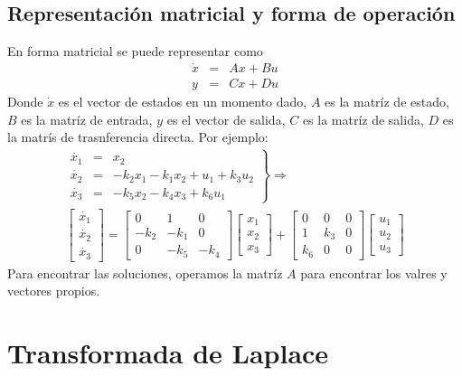 \documentclass[12pt,spanish,lettersize]{report}
\begin{document}
\subsection{Representaci\'on matricial y forma de operaci\'on}
En forma matricial se puede representar como
\begin{equation}
\begin{array}{rcl}
\dot{x}&=&Ax+Bu\\
y&=&Cx+Du
\end{array}
\end{equation}
Donde $\dot{x}$ es el vector de estados en un momento dado, $A$ es la matr\'iz de estado, $B$ es la matr\'iz de entrada, $y$ es el vector de salida, $C$ es la matr\'iz de salida, $D$ es la matr\'is de trasnferencia directa.
Por ejemplo:\\
\begin{eqnarray}
\left.
\begin{array}{rcl}
\dot{x_1}&=&x_2\\
\dot{x_2}&=&-k_2x_1-k_1x_2+u_1+k_3u_2\\
\dot{x_3}&=&-k_5x_2-k_4x_3+k_6u_1
\end{array}
\right\}\Rightarrow\\
\left[
\begin{array}{c}
\dot{x_1}\\
\dot{x_2}\\
\dot{x_3}
\end{array}
\right]=\left[
\begin{array}{ccc}
0&1&0\\
-k_2&-k_1&0\\
0&-k_5&-k_4
\end{array}
\right]
\left[
\begin{array}{c}
x_1\\
x_2\\
x_3
\end{array}
\right]
+\left[
\begin{array}{ccc}
0&0&0\\
1&k_3&0\\
k_6&0&0
\end{array}
\right]
\left[
\begin{array}{c}
u_1\\
u_2\\
u_3
\end{array}
\right]
\end{eqnarray}
Para encontrar las soluciones, operamos la matr\'iz $A$ para encontrar los valres y vectores propios.
\section{Transformada de Laplace}
\end{document}
